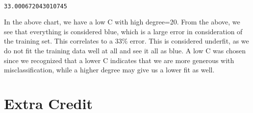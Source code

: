 \documentclass[11pt]{article}
\begin{document}
    \begin{center}
    \end{center}
    { \hspace*{\fill} \\}
    
    \begin{Verbatim}[commandchars=\\\{\}]
33.000672043010745

    \end{Verbatim}

    In the above chart, we have a low C with high degree=20. From the above,
we see that everything is considered blue, which is a large error in
consideration of the training set. This correlates to a 33\% error. This
is considered underfit, as we do not fit the training data well at all
and see it all as blue. A low C was chosen since we recognized that a
lower C indicates that we are more generous with misclassification,
while a higher degree may give us a lower fit as well.

    \section{Extra Credit}\label{extra-credit}
\end{document}
